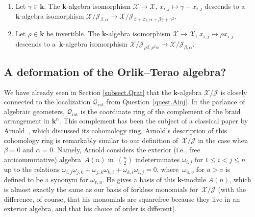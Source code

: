 \documentclass[pdftex]{sigma}
\numberwithin{equation}{section}
\begin{document}
\begin{Example}\quad
\begin{enumerate}\itemsep=0pt
\item[(a)] Let $\gamma\in\mathbf{k}$. The $\mathbf{k}$-algebra isomorphism $\mathcal{X}\rightarrow\mathcal{X}$, $x_{i,j}\mapsto\gamma-x_{i,j}$ descends to a $\mathbf{k}$-algebra isomorphism $\mathcal{X}/\mathcal{J}_{\beta,\alpha }\rightarrow\mathcal{X}/\mathcal{J}_{\beta+2\gamma,\alpha+\beta\gamma +\gamma^{2}}$.
\item[(b)] Let $\rho\in\mathbf{k}$ be invertible. The $\mathbf{k}$-algebra isomorphism $\mathcal{X}\rightarrow\mathcal{X}$, $x_{i,j}\mapsto\rho x_{i,j}$ descends to a~$\mathbf{k}$-algebra isomorphism $\mathcal{X}/\mathcal{J}_{\rho\beta,\rho^{2}\alpha}\rightarrow\mathcal{X}/\mathcal{J}_{\beta,\alpha}$.
\end{enumerate}
\end{Example}

\subsection{A deformation of the Orlik--Terao algebra?}\label{subsect.arnold}

We have already seen in Section \ref{subsect.Qrat} that the $\mathbf{k}$-algebra $\mathcal{X}/\mathcal{J}$ is closely connected to the localization $\mathcal{Q}_{\operatorname*{rat}}$ from Question~\ref{quest.Ainj}. In the parlance of algebraic geometers, $\mathcal{Q}_{\operatorname*{rat}}$ is the coordinate ring of the complement of the braid arrangement in $\mathbf{k}^{n}$. This complement has been the subject of a classical paper by Arnold~\cite{Arnold71}, which discussed its cohomology ring. Arnold's description of this cohomology ring is remarkably similar to our definition of~$\mathcal{X}/\mathcal{J}$ in the case when $\beta=0$ and $\alpha=0$. Namely, Arnold
considers the exterior (i.e., free anticommutative) algebra~$A(n) $ in~$\binom{n}{2}$ indeterminates $\omega_{i,j}$ for $1\leq i<j\leq n$ up to the relations $\omega_{i,j}\omega_{j,k}+\omega_{j,k}\omega_{k,i}+\omega_{k,i}\omega_{i,j}=0$, where~$\omega_{u,v}$ for $u>v$ is defined to be a synonym for $\omega_{v,u}$. He gives a basis \cite[Corollary~3]{Arnold71} of this $\mathbf{k}$-module $A(n) $, which is almost exactly the same as our basis of forkless monomials for~$\mathcal{X}/\mathcal{J}$ (with the difference, of course, that his monomials are squarefree because they live in an exterior algebra, and that his choice of order is different).
\end{document}
